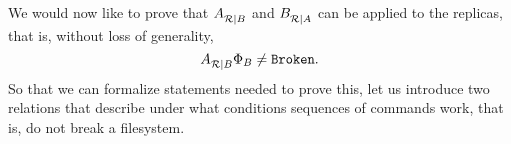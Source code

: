 We would now like to prove that ${A}^{}_{\mathcal{R}|{B}}$ and ${B}^{}_{\mathcal{R}|{A}}$ can be applied to the replicas,
that is, without loss of generality,
\[ {A}^{}_{\mathcal{R}|{B}}\Phi_B\neq\mathtt{Broken}. \]
So that we can formalize statements needed to prove this,
let us introduce two relations that describe under what conditions
sequences of commands work, that is, do not break a filesystem.
